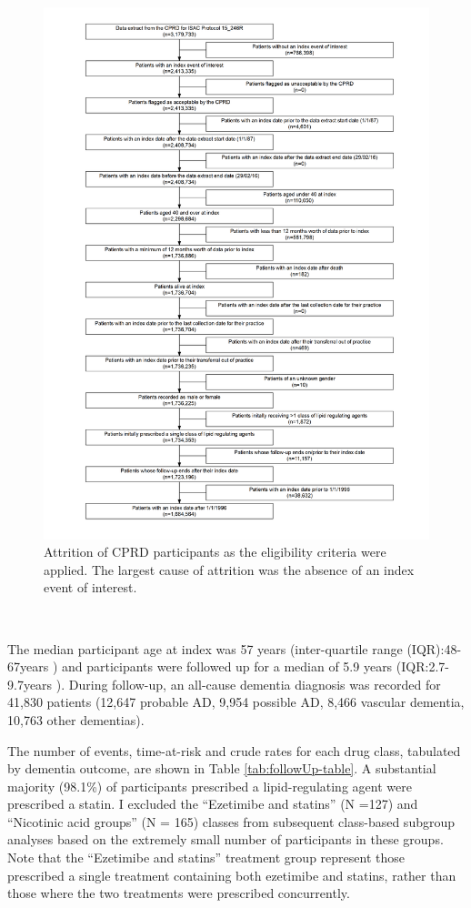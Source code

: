 \documentclass[a4paper, twoside]{templates/ociamthesis}
\begin{document}
\begin{figure}[H]
\includegraphics[width=1\linewidth]{figures/cprd-analysis/cohort_attrition} \caption[Attrition of CPRD participants]{Attrition of CPRD participants as the eligibility criteria were applied. The largest cause of attrition was the absence of an index event of interest.}\label{fig:cprdFlowchart}
\end{figure}

~

The median participant age at index was 57 years (inter-quartile range (IQR):48-67years ) and participants were followed up for a median of 5.9 years (IQR:2.7-9.7years ). During follow-up, an all-cause dementia diagnosis was recorded for 41,830 patients (12,647 probable AD, 9,954 possible AD, 8,466 vascular dementia, 10,763 other dementias).

The number of events, time-at-risk and crude rates for each drug class, tabulated by dementia outcome, are shown in Table \ref{tab:followUp-table}. A substantial majority (98.1\%) of participants prescribed a lipid-regulating agent were prescribed a statin. I excluded the ``Ezetimibe and statins'' (N =127) and ``Nicotinic acid groups'' (N = 165) classes from subsequent class-based subgroup analyses based on the extremely small number of participants in these groups. Note that the ``Ezetimibe and statins'' treatment group represent those prescribed a single treatment containing both ezetimibe and statins, rather than those where the two treatments were prescribed concurrently.
\end{document}
